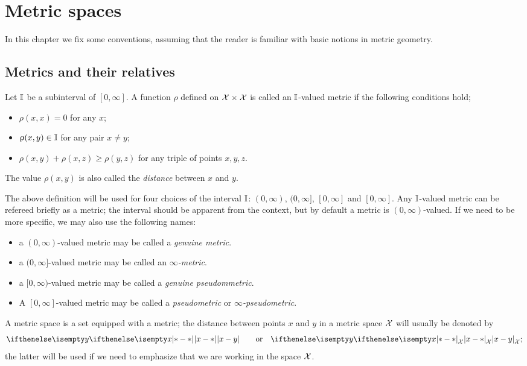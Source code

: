 \chapter{Metric spaces}
In this chapter we fix some conventions, assuming that the reader is familiar with basic notions in metric geometry.

\section{Metrics and their relatives}
\label{sec:metric spaces}

Let $\mathbb{I}$ be a subinterval of $[0,\infty]$.
A function $\rho$ defined on $\spc{X}\times\spc{X}$ is called an $\mathbb{I}$-valued metric if the following conditions hold;
\begin{itemize}
 \item $\rho(x,x)=0$ for any $x$;
 \item $\rho(x,y)\in \II$ for any pair $x\ne y$;
 \item $\rho(x,y)+\rho(x,z)\ge \rho(y,z)$ for any triple of points $x,y, z$.
\end{itemize}
The value $\rho(x,y)$ is also called the \emph{distance} between $x$ and $y$.


The above definition will be used for four choices of the interval $\mathbb{I}$: $(0,\infty)$, $(0,\infty]$, $[0,\infty]$ and $[0,\infty]$.
Any $\mathbb{I}$-valued metric can be refereed briefly as a metric;
the interval should be apparent from the context, but by default a metric is $(0,\infty)$-valued. 
If we need to be more specific, we may also use the following names:
\begin{itemize}
\item a $(0,\infty)$-valued metric may be called a \emph{genuine metric}.
\item a $(0,\infty]$-valued metric may be called an \emph{$\infty$-metric}.
\item a $[0,\infty)$-valued metric may be called  a \emph{genuine pseudommetric}.
\item A $[0,\infty]$-valued metric may be called a \emph{pseudometric} or \emph{$\infty$-pseudometric}.
\end{itemize}

A metric space is a set equipped with a metric;
the distance between points $x$ and $y$ in a metric space $\mathcal{X}$ will  usually be denoted by \[\dist{x}{y}{}\qquad\text{or}\quad \dist{x}{y}{\spc{X}};\]
the latter will be used if we need to emphasize that we are working in the space $\mathcal{X}$.

